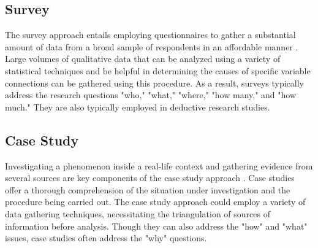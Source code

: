 \subsection{Survey}
\par{The survey approach entails employing questionnaires to gather a substantial amount of data from a broad sample of respondents in an affordable manner \citep{saunders2009research}. Large volumes of qualitative data that can be analyzed using a variety of statistical techniques and be helpful in determining the causes of specific variable connections can be gathered using this procedure. As a result, surveys typically address the research questions "who," "what," "where," "how many," and "how much." They are also typically employed in deductive research studies.}
\subsection{Case Study}
\par{Investigating a phenomenon inside a real-life context and gathering evidence from several sources are key components of the case study approach \citep{saunders2009research}. Case studies offer a thorough comprehension of the situation under investigation and the procedure being carried out. The case study approach could employ a variety of data gathering techniques, necessitating the triangulation of sources of information before analysis. Though they can also address the "how" and "what" issues, case studies often address the "why" questions.}

